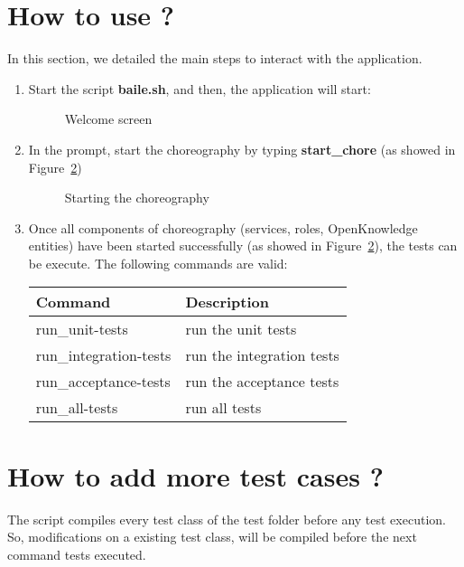 \documentclass{article}	%
\begin{document}
\section{ How to use ? }
In this section, we detailed the main steps to interact with the application.

\begin{enumerate}
 \item Start the script \textbf{baile.sh}, and then, the application will start:

  \begin{figure}[htbp]
  \centering
  \setlength\fboxrule{1.0pt}
  \caption{Welcome screen}
  \label{welcome-screen}
  \end{figure}

  \item  In the prompt, start the choreography by typing \textbf{start\_chore} (as showed in Figure~\ref{chore})
  
  \begin{figure}[htbp]
  \centering
  \setlength\fboxrule{1.0pt}
  \caption{Starting the choreography}
  \label{chore}
  \end{figure}

  \item Once all components of choreography (services, roles, OpenKnowledge entities) have been started successfully (as showed in Figure~\ref{chore}), the tests can be execute. The following commands are valid:

  \begin{table}[htb]
  \centering
  \begin{tabular}{|l|l|}
  \hline
  Command & Description \\
  \hline
  \hline
  run\_unit-tests & run the unit tests\\
  run\_integration-tests & run the integration tests \\
  run\_acceptance-tests & run the acceptance tests \\
  run\_all-tests & run all tests \\
  \hline
  \end{tabular}
  \end{table}

\end{enumerate}


\section{ How to add more test cases ? }
The script compiles every test class of the test folder before any test execution. So, modifications on a existing test class, will be compiled before the next command tests executed.
\end{document}
